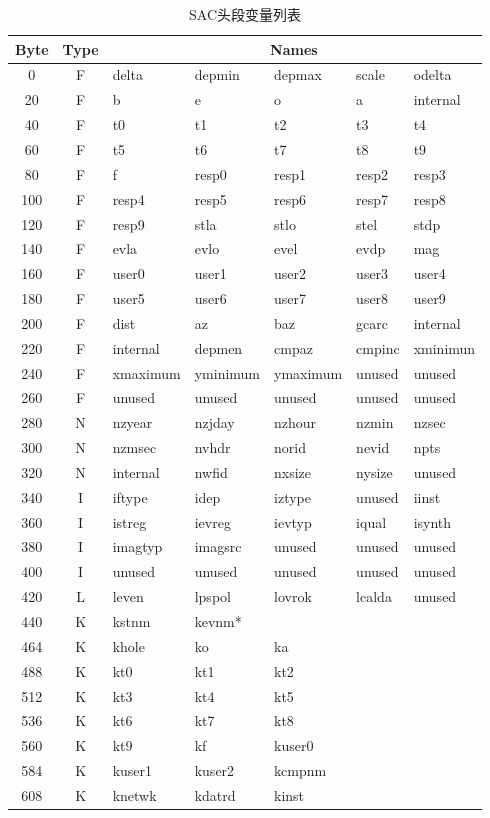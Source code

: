 \begin{table}[H]
\ttfamily
\small
\centering
\caption{SAC头段变量列表}
\label{table:header-variables}
\begin{tabular}{c|c|lllll}
	\toprule
    Byte	&	Type	&	\multicolumn{5}{c}{Names}\\
	\midrule
	0		&	F	&	delta	&	depmin	&	depmax	&	scale	&	odelta	\\
	20		&	F	&	b		&	e		&	o		&	a		&	internal\\
	40		&	F	&	t0		&	t1		&	t2		&	t3		&	t4		\\
	60		&	F	&	t5		&	t6		&	t7		&	t8		&	t9		\\
	80		&	F	&	f		&	resp0	&	resp1	&	resp2	&	resp3	\\
	100		&	F	&	resp4	&	resp5	&	resp6	&	resp7	&	resp8	\\
    120		&	F	&	resp9	&	stla	&	stlo	&	stel	&	stdp	\\
	140		&	F	&	evla	&	evlo	&	evel	&	evdp	&	mag		\\
	160		&	F	&	user0	&	user1	&	user2	&	user3	&	user4	\\
	180		&	F	&	user5	&	user6	&	user7	&	user8	&	user9	\\
	200		&	F	&	dist	&	az		&	baz		&	gcarc	&	internal\\
	220		&	F	&	internal&	depmen	&	cmpaz	&	cmpinc	&	xminimun\\
	240		&	F	&	xmaximum&	yminimum&	ymaximum&	unused	&	unused	\\
	260		&	F	&	unused	&	unused	&	unused	&	unused	&	unused	\\
	280		&	N	&	nzyear	&	nzjday	&	nzhour	&	nzmin	&	nzsec	\\
	300		&	N	&	nzmsec	&	nvhdr	&	norid	&	nevid	&	npts	\\
	320		&	N	&	internal&	nwfid	&	nxsize	&	nysize	&	unused	\\
	340		&	I	&	iftype	&	idep	&	iztype	&	unused	&	iinst	\\
	360		&	I	&	istreg	&	ievreg	&	ievtyp	&	iqual	&	isynth	\\
    380		&	I	&	imagtyp &	imagsrc	&	unused	&	unused	&	unused	\\
	400		&	I	&	unused	&	unused	&	unused	&	unused	&	unused	\\
	420		&	L	&	leven	&	lpspol	&	lovrok	&	lcalda	&	unused	\\
	440		&	K	&	kstnm	&	kevnm*	&			&			&			\\
	464		&	K	&	khole	&	ko		&	ka		&			&			\\
	488		&	K	&	kt0		&	kt1		&	kt2		&			&			\\
	512		&	K	&	kt3		&	kt4		&	kt5		&			&			\\
	536		&	K	&	kt6		&	kt7		&	kt8		&			&			\\
	560		&	K	&	kt9		&	kf		&	kuser0	&			&			\\
	584		&	K	&	kuser1	&	kuser2	&	kcmpnm	&			&			\\
	608		&	K	&	knetwk	&	kdatrd	&	kinst	&			&			\\
    \bottomrule
\end{tabular}
\end{table}

